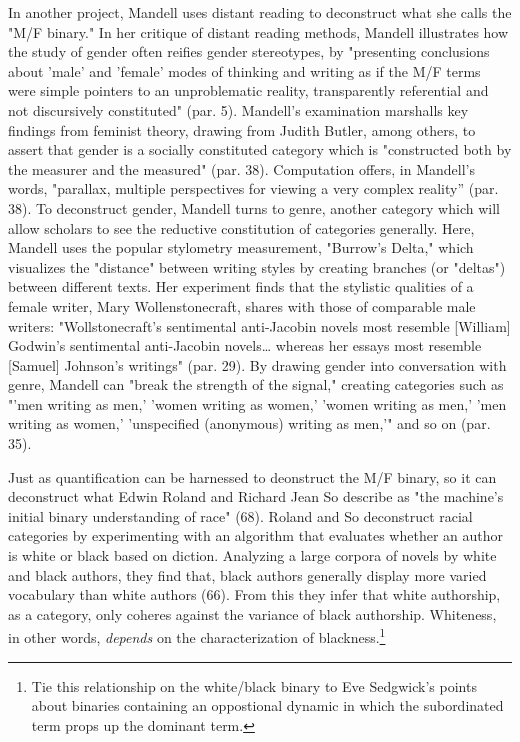\documentclass[11pt]{article}
\begin{document}
In another project, Mandell uses distant reading to deconstruct what
she calls the "M/F binary." In her critique of distant reading
methods, Mandell illustrates how the study of gender often reifies
gender stereotypes, by "presenting conclusions about 'male' and
'female' modes of thinking and writing as if the M/F terms were simple
pointers to an unproblematic reality, transparently referential and
not discursively constituted" (par. 5). Mandell's examination
marshalls key findings from feminist theory, drawing from Judith
Butler, among others, to assert that gender is a socially constituted
category which is "constructed both by the measurer and the measured"
(par. 38). Computation offers, in Mandell's words, "parallax, multiple
perspectives for viewing a very complex reality” (par. 38). To
deconstruct gender, Mandell turns to genre, another category which
will allow scholars to see the reductive constitution of categories
generally. Here, Mandell uses the popular stylometry measurement,
"Burrow's Delta," which visualizes the "distance" between writing
styles by creating branches (or "deltas") between different texts. Her
experiment finds that the stylistic qualities of a female writer, Mary
Wollenstonecraft, shares with those of comparable male writers:
"Wollstonecraft’s sentimental anti-Jacobin novels most resemble
[William] Godwin’s sentimental anti-Jacobin novels\ldots{} whereas her
essays most resemble [Samuel] Johnson’s writings" (par. 29). By
drawing gender into conversation with genre, Mandell can "break the
strength of the signal," creating categories such as "'men writing as
men,' 'women writing as women,' 'women writing as men,' 'men writing
as women,' 'unspecified (anonymous) writing as men,'" and so on
(par. 35).

Just as quantification can be harnessed to deonstruct the M/F binary,
so it can deconstruct what Edwin Roland and Richard Jean So describe
as "the machine's initial binary understanding of race" (68). Roland
and So deconstruct racial categories by experimenting with an
algorithm that evaluates whether an author is white or black based on
diction. Analyzing a large corpora of novels by white and black
authors, they find that, black authors generally display more varied
vocabulary than white authors (66). From this they infer that white
authorship, as a category, only coheres against the variance of black
authorship. Whiteness, in other words, \emph{depends} on the
characterization of blackness.\footnote{Tie this relationship on the white/black binary to Eve
Sedgwick's points about binaries containing an oppostional dynamic in
which the subordinated term props up the dominant term.}
\end{document}
